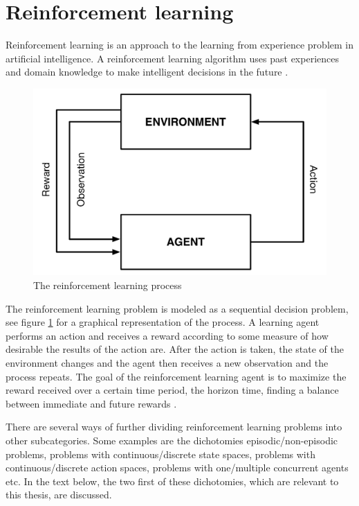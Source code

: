 \section{Reinforcement learning}

Reinforcement learning is an approach to the learning from experience problem in artificial intelligence. A reinforcement learning algorithm uses past experiences and domain knowledge to make intelligent decisions in the future \parencite{barto1998reinforcement}.

\begin{figure}[htbp]
\includegraphics[width=\textwidth]{images/agent-environment.pdf}
\caption{The reinforcement learning process}
\label{fig:agentandenvironment}
\end{figure}

The reinforcement learning problem is modeled as a sequential decision problem, see figure \ref{fig:agentandenvironment} for a graphical representation of the process. A learning agent performs an action and receives a reward according to some measure of how desirable the results of the action are.  After the action is taken, the state of the environment changes and the agent then receives a new observation and the process repeats. The goal of the reinforcement learning agent is to maximize the reward received over a certain time period, the horizon time, finding a balance between immediate and future rewards \parencite{barto1998reinforcement}. 

There are several ways of further dividing reinforcement learning problems into other subcategories. Some examples are the dichotomies episodic/non-episodic problems, problems with continuous/discrete state spaces, problems with continuous/discrete action spaces, problems with one/multiple concurrent agents etc. In the text below, the two first of these dichotomies, which are relevant to this thesis, are discussed. 

